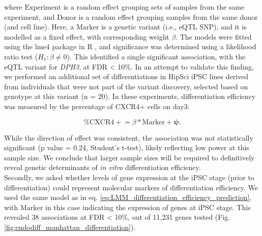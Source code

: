 where $\mathrm{Experiment}$ is a random effect grouping sets of samples from the same experiment, and $\mathrm{Donor}$ is a random effect grouping samples from the same donor (and cell line). 
Here, a $\mathrm{Marker}$ is a genetic variant (i.e., eQTL SNP), and it is modelled as a fixed effect, with corresponding weight $\beta$.
The models were fitted using the lme4 package in R \cite{bates2014fitting}, and significance was determined using a likelihood ratio test ($H_1: \beta \neq 0$).
This identified a single significant association, with the eQTL variant for \textit{DPH3}, at FDR < 10\%.
In an attempt to validate this finding, we performed an additional set of differentiations in HipSci iPSC lines derived from individuals that were not part of the variant discovery, selected based on genotype at this variant (n = 20). 
In these experiments, differentiation efficiency was measured by the percentage of CXCR4+ cells on day3:

\begin{equation}
    \mathrm{\% CXCR4+} = \beta*\mathrm{Marker} + \boldsymbol{\psi}.
\end{equation}

While the direction of effect was consistent, the association was not statistically significant (p value = 0.24, Student’s t-test), likely reflecting low power at this sample size. 
We conclude that larger sample sizes will be required to definitively reveal genetic determinants of \textit{in vitro} differentiation efficiency.\\

Secondly, we asked whether levels of gene expression at the iPSC stage (prior to differentiation) could represent molecular markers of differentiation efficiency.
We used the same model as in eq. \eqref{eq:LMM_differentiation_efficiency_prediction}, with $\mathrm{Marker}$ in this case indicating the expression of genes at iPSC stage.
This revealed 38 associations at FDR < 10\%, out of 11,231 genes tested (Fig. \ref{fig:endodiff_manhattan_differentiation}).


